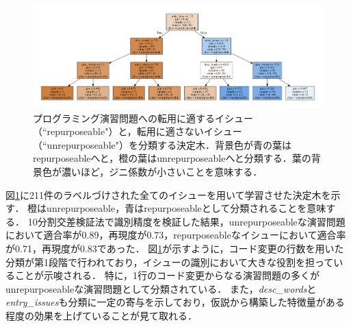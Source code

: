 \begin{figure}[t]
	\centering
  \includegraphics[width=1.0\columnwidth]{graph_20181005.png}
  \caption{プログラミング演習問題への転用に適するイシュー（``repurposeable"）と，転用に適さないイシュー（``unrepurposeable"）を分類する決定木．背景色が青の葉はrepurposeableへと，橙の葉はunrepurposeableへと分類する．葉の背景色が濃いほど，ジニ係数が小さいことを意味する．}
  \label{fig:dtgraph}
\end{figure}


図\ref{fig:dtgraph}に211件のラベルづけされた全てのイシューを用いて学習させた決定木を示す．
橙はunrepurposeable，青はrepurposeableとして分類されることを意味する．
10分割交差検証法で識別精度を検証した結果，unrepurposeableな演習問題において適合率が0.89，再現度が0.73，repurposeableなイシューにおいて適合率が0.71，再現度が0.83であった．
図\ref{fig:dtgraph}が示すように，コード変更の行数を用いた分類が第1段階で行われており，イシューの識別において大きな役割を担っていることが示唆される．
特に，1行のコード変更からなる演習問題の多くがunrepurposeableな演習問題として分類されている．
また，\textit{desc\_words}と\textit{entry\_issues}も分類に一定の寄与を示しており，仮説から構築した特徴量がある程度の効果を上げていることが見て取れる．




